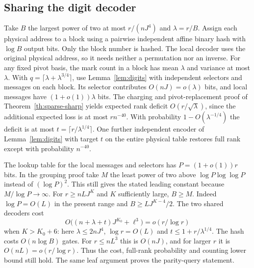 \subsection{Sharing the digit decoder}
Take $B$ the largest power of two at most $r/(nJ^4)$ and $\lambda=r/B$. Assign each physical address to a block using a pairwise independent affine binary hash with $\log B$ output bits. Only the block number is hashed. The local decoder uses the original physical address, so it needs neither a permutation nor an inverse. For any fixed pivot basis, the mark count in a block has mean $\lambda$ and variance at most $\lambda$. With $q=\lceil\lambda+\lambda^{3/4}\rceil$, use Lemma~\ref{lem:digits} with independent selectors and messages on each block. Its selector contributes $O(nJ)=o(\lambda)$ bits, and local messages have $(1+o(1))\lambda$ bits. The charging and pivot-replacement proof of Theorem~\ref{th:sparse-sharp} yields expected rank deficit $O(r/\sqrt\lambda)$, since the additional expected loss is at most $rn^{-40}$. With probability $1-O(\lambda^{-1/4})$ the deficit is at most $t=\lceil r/\lambda^{1/4}\rceil$. One further independent encoder of Lemma~\ref{lem:digits} with target $t$ on the entire physical table restores full rank except with probability $n^{-40}$.

The lookup table for the local messages and selectors has $P=(1+o(1))r$ bits. In the grouping proof take $M$ the least power of two above $\log P\log\log P$ instead of $(\log P)^2$. This still gives the stated leading constant because $M/\log P\to\infty$. For $r\ge nLJ^K$ and $K$ sufficiently large, $B\ge M$. Indeed $\log P=O(L)$ in the present range and $B\ge LJ^{K-4}/2$. The two shared decoders cost
\[
  O\bigl((n+\lambda+t)J^{K_0}+\ell^3\bigr)=o(r/\log r)
\]
when $K>K_0+6$: here $\lambda\le2nJ^4$, $\log r=O(L)$ and $t\le 1+r/\lambda^{1/4}$. The hash costs $O(n\log B)$ gates. For $r\le nL^3$ this is $O(nJ)$, and for larger $r$ it is $O(nL)=o(r/\log r)$. Thus the cost, full-rank probability and counting lower bound still hold. The same leaf argument proves the parity-query statement.

